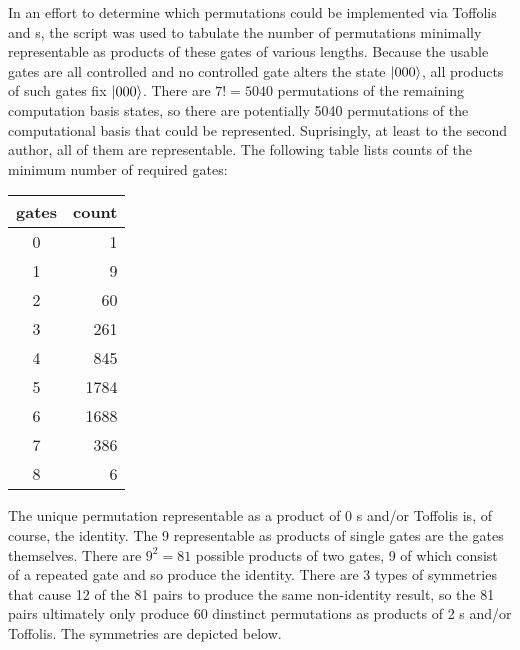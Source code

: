 In an effort to determine which permutations could be implemented via Toffolis and \CNOT s, the script was used to tabulate the number of permutations minimally representable as products of these gates of various lengths.  Because the usable gates are all controlled and no controlled gate alters the state $\ket{000}$, all products of such gates fix $\ket{000}$.  There are $7!=5040$ permutations of the remaining computation basis states, so there are potentially 5040 permutations of the computational basis that could be represented.  Suprisingly, at least to the second author, all of them are representable.  The following table lists counts of the minimum number of required gates:
\begin{center}
\begin{tabular}{|c|r|}
 gates & \multicolumn{1}{c|}{count} \\ \hline
0 & 1 \\ \hline
1 & 9 \\ \hline
2 & 60 \\ \hline
3 & 261 \\ \hline
4 & 845 \\ \hline
5 & 1784 \\ \hline
6 & 1688 \\ \hline
7 & 386 \\ \hline
8 & 6
\end{tabular}
\end{center}
\vspace{-5pt} The unique permutation representable as a product of 0 \CNOT s and/or Toffolis is, of course, the identity.  The 9 representable as products of single gates are the gates themselves.  There are $9^2=81$ possible products of two gates, 9 of which consist of a repeated gate and so produce the identity.  There are 3 types of symmetries that cause 12 of the 81 pairs to produce the same non-identity result, so the 81 pairs ultimately only produce 60 dinstinct permutations as products of 2 \CNOT s and/or Toffolis.  The symmetries are depicted below.
